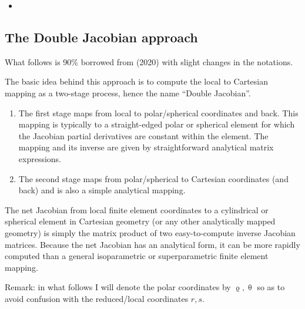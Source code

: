 \vspace{1cm}

\Literature 
\begin{itemize}
\item {}
\end{itemize}

\subsection{The Double Jacobian approach}

What follows is 90\% borrowed from \textcite{moth20} (2020) with slight changes in the notations.

The basic idea behind this approach is to compute the local to Cartesian mapping as a two-stage process, hence the name ``Double Jacobian''. 

\begin{enumerate}
\item 
The first stage maps from local to polar/spherical coordinates and back. This mapping is typically 
to a straight-edged polar or spherical element for which the Jacobian partial derivatives 
are constant within the element. The mapping and its inverse are given by straightforward analytical matrix expressions. 
\item The second stage maps from polar/spherical to Cartesian coordinates (and back) and is also a simple analytical mapping. 
\end{enumerate}
The net Jacobian from local finite element coordinates to a cylindrical or spherical element in Cartesian geometry 
(or any other analytically mapped geometry) is simply the matrix product of two easy-to-compute inverse Jacobian matrices. 
Because the net Jacobian has an analytical form, it can be more rapidly computed than a general 
isoparametric or superparametric finite element mapping.

Remark: in what follows I will denote the polar coordinates by $\upvarrho,\uptheta$ so as to avoid confusion with the reduced/local coordinates $r,s$.


